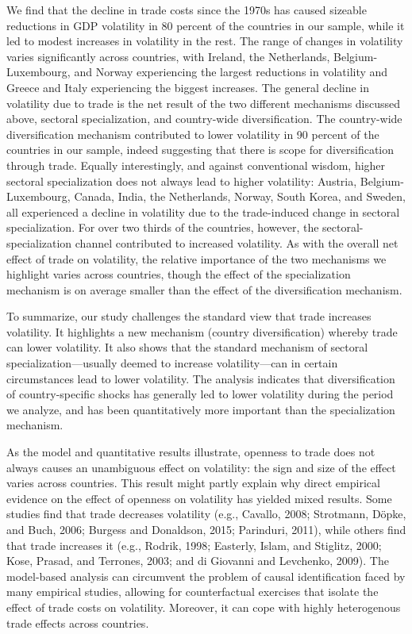 \documentclass[12pt]{article}
\begin{document}
We find that the decline in trade costs since the 1970s has caused sizeable
reductions in GDP volatility in 80 percent of the countries in our sample,
while it led to modest increases in volatility in the rest. The range of
changes in volatility varies significantly across countries, with Ireland,
the Netherlands, Belgium-Luxembourg, and Norway experiencing the largest
reductions in volatility and Greece and Italy experiencing the biggest
increases. The general decline in volatility due to trade is the net result
of the two different mechanisms discussed above, sectoral specialization,
and country-wide diversification. The country-wide diversification mechanism
contributed to lower volatility in 90 percent of the countries in our
sample, indeed suggesting that there is scope for diversification through
trade. Equally interestingly, and against conventional wisdom, higher
sectoral specialization does not always lead to higher volatility: Austria,
Belgium-Luxembourg, Canada, India, the Netherlands, Norway, South Korea, and
Sweden, all experienced a decline in volatility due to the trade-induced
change in sectoral specialization. For over two thirds of the countries,
however, the sectoral-specialization channel contributed to increased
volatility. As with the overall net effect of trade on volatility, the
relative importance of the two mechanisms we highlight varies across
countries, though the effect of the specialization mechanism is on average
smaller than the effect of the diversification mechanism.

To summarize, our study challenges the standard view that trade increases
volatility. It highlights a new mechanism (country diversification) whereby
trade can lower volatility. It also shows that the standard mechanism of
sectoral specialization---usually deemed to increase volatility---can in
certain circumstances lead to lower volatility. The analysis indicates that
diversification of country-specific shocks has generally led to lower
volatility during the period we analyze, and has been quantitatively more
important than the specialization mechanism.

As the model and quantitative results illustrate, openness to trade does not
always causes an unambiguous effect on volatility: the sign and size of the
effect varies across countries. This result might partly explain why direct
empirical evidence on the effect of openness on volatility has yielded mixed
results. Some studies find that trade decreases volatility (e.g., Cavallo,
2008; Strotmann, D\"{o}pke, and Buch, 2006; Burgess and Donaldson, 2015;
Parinduri, 2011), while others find that trade increases it (e.g., Rodrik,
1998; Easterly, Islam, and Stiglitz, 2000; Kose, Prasad, and Terrones, 2003;
and di Giovanni and Levchenko, 2009). The model-based analysis can
circumvent the problem of causal identification faced by many empirical
studies, allowing for counterfactual exercises that isolate the effect of
trade costs on volatility. Moreover, it can cope with highly heterogenous
trade effects across countries.
\end{document}

